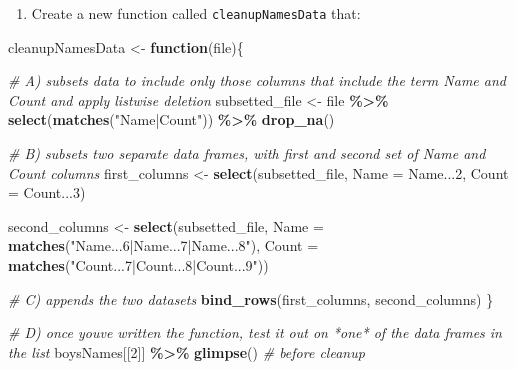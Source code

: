 \documentclass[
]{book}
\newenvironment{Shaded}{\begin{snugshade}}{\end{snugshade}}
\newcommand{\CommentTok}[1]{\textcolor[rgb]{0.56,0.35,0.01}{\textit{#1}}}
\newcommand{\ControlFlowTok}[1]{\textcolor[rgb]{0.13,0.29,0.53}{\textbf{#1}}}
\newcommand{\DataTypeTok}[1]{\textcolor[rgb]{0.13,0.29,0.53}{#1}}
\newcommand{\DecValTok}[1]{\textcolor[rgb]{0.00,0.00,0.81}{#1}}
\newcommand{\KeywordTok}[1]{\textcolor[rgb]{0.13,0.29,0.53}{\textbf{#1}}}
\newcommand{\NormalTok}[1]{#1}
\newcommand{\OperatorTok}[1]{\textcolor[rgb]{0.81,0.36,0.00}{\textbf{#1}}}
\newcommand{\StringTok}[1]{\textcolor[rgb]{0.31,0.60,0.02}{#1}}
\providecommand{\tightlist}{%
  \setlength{\itemsep}{0pt}\setlength{\parskip}{0pt}}
\begin{document}
\begin{alert}

\begin{enumerate}
\def\labelenumi{\arabic{enumi}.}
\tightlist
\item
  Create a new function called \texttt{cleanupNamesData} that:
\end{enumerate}

\begin{Shaded}
\begin{Highlighting}[]
\NormalTok{cleanupNamesData \textless{}{-}}\StringTok{ }\ControlFlowTok{function}\NormalTok{(file)\{}

  \CommentTok{\# A) subsets data to include only those columns that include the term \textasciigrave{}Name\textasciigrave{} and \textasciigrave{}Count\textasciigrave{} and apply listwise deletion}
\NormalTok{  subsetted\_file \textless{}{-}}\StringTok{ }\NormalTok{file }\OperatorTok{\%\textgreater{}\%}
\StringTok{    }\KeywordTok{select}\NormalTok{(}\KeywordTok{matches}\NormalTok{(}\StringTok{"Name|Count"}\NormalTok{)) }\OperatorTok{\%\textgreater{}\%}
\StringTok{    }\KeywordTok{drop\_na}\NormalTok{()}

  \CommentTok{\# B) subsets two separate data frames, with first and second set of \textasciigrave{}Name\textasciigrave{} and \textasciigrave{}Count\textasciigrave{} columns }
\NormalTok{  first\_columns \textless{}{-}}\StringTok{ }\KeywordTok{select}\NormalTok{(subsetted\_file, }\DataTypeTok{Name =}\NormalTok{ Name...}\DecValTok{2}\NormalTok{, }\DataTypeTok{Count =}\NormalTok{ Count...}\DecValTok{3}\NormalTok{) }

\NormalTok{  second\_columns \textless{}{-}}\StringTok{ }\KeywordTok{select}\NormalTok{(subsetted\_file, }\DataTypeTok{Name =} \KeywordTok{matches}\NormalTok{(}\StringTok{"Name...6|Name...7|Name...8"}\NormalTok{),}
                                           \DataTypeTok{Count =} \KeywordTok{matches}\NormalTok{(}\StringTok{"Count...7|Count...8|Count...9"}\NormalTok{))}

  \CommentTok{\# C) appends the two datasets}
  \KeywordTok{bind\_rows}\NormalTok{(first\_columns, second\_columns)}
\NormalTok{\}}


\CommentTok{\# D) once you\textquotesingle{}ve written the function, test it out on *one* of the data frames in the list}
\NormalTok{boysNames[[}\DecValTok{2}\NormalTok{]] }\OperatorTok{\%\textgreater{}\%}\StringTok{ }\KeywordTok{glimpse}\NormalTok{() }\CommentTok{\# before cleanup}
\end{Highlighting}
\end{Shaded}


\end{alert}
\end{document}
